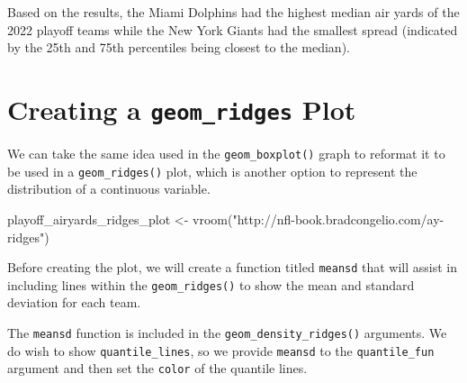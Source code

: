 \documentclass[
  letterpaper,
]{krantz}
\newenvironment{Shaded}{\begin{snugshade}}{\end{snugshade}}
\newcommand{\FunctionTok}[1]{\textcolor[rgb]{0.28,0.35,0.67}{#1}}
\newcommand{\NormalTok}[1]{\textcolor[rgb]{0.00,0.23,0.31}{#1}}
\newcommand{\OtherTok}[1]{\textcolor[rgb]{0.00,0.23,0.31}{#1}}
\newcommand{\StringTok}[1]{\textcolor[rgb]{0.13,0.47,0.30}{#1}}
\begin{document}
Based on the results, the Miami Dolphins had the highest median air
yards of the 2022 playoff teams while the New York Giants had the
smallest spread (indicated by the 25th and 75th percentiles being
closest to the median).

\hypertarget{creating-a-geom_ridges-plot}{%
\section{\texorpdfstring{Creating a \texttt{geom\_ridges}
Plot}{Creating a geom\_ridges Plot}}\label{creating-a-geom_ridges-plot}}

We can take the same idea used in the \texttt{geom\_boxplot()} graph to
reformat it to be used in a \texttt{geom\_ridges()} plot, which is
another option to represent the distribution of a continuous variable.

\begin{Shaded}
\begin{Highlighting}[]
\NormalTok{playoff\_airyards\_ridges\_plot }\OtherTok{\textless{}{-}} \FunctionTok{vroom}\NormalTok{(}\StringTok{"http://nfl{-}book.bradcongelio.com/ay{-}ridges"}\NormalTok{)}
\end{Highlighting}
\end{Shaded}

Before creating the plot, we will create a function titled
\texttt{meansd} that will assist in including lines within the
\texttt{geom\_ridges()} to show the mean and standard deviation for each
team.

The \texttt{meansd} function is included in the
\texttt{geom\_density\_ridges()} arguments. We do wish to show
\texttt{quantile\_lines}, so we provide \texttt{meansd} to the
\texttt{quantile\_fun} argument and then set the \texttt{color} of the
quantile lines.
\end{document}
